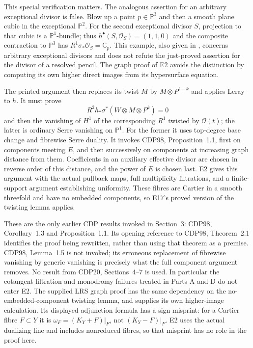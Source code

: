 This special verification matters. The analogous assertion for
an arbitrary exceptional divisor is false. Blow up a point
$p\in\mathbb P^3$ and then a smooth plane cubic in the exceptional
$\mathbb P^2$. For the second exceptional divisor $S$, projection
to that cubic is a $\mathbb P^1$-bundle; thus
$h^\bullet(S,\mathcal O_S)=(1,1,0)$ and the composite contraction
to $\mathbb P^3$ has
$R^1\sigma_*\mathcal O_S=\mathbb C_p$.
This example, also given in \cite{LRS2019}, concerns arbitrary
exceptional divisors and does not refute the just-proved assertion
for the divisor of a resolved pencil. The graph proof of E2
avoids the distinction by computing its own higher direct images
from its hypersurface equation.

The printed argument then replaces its twist $M$ by
$M\otimes P^{t+k}$ and applies Leray to $h$. It must prove
\[
 R^2h_*\sigma^*(W\otimes M\otimes P^k)=0
\]
and then the vanishing of $H^1$ of the corresponding $R^1$
twisted by $\mathcal O(t)$; the latter is ordinary Serre
vanishing on $\mathbb P^1$. For the former it uses top-degree
base change and fibrewise Serre duality. It invokes CDP98,
Proposition~1.1, first on components meeting $E$, and then
successively on components at increasing graph distance from
them. Coefficients in an auxiliary effective divisor are chosen
in reverse order of this distance, and the power of $E$ is
chosen last. E2 gives this argument with the actual pullback
maps, full multiplicity filtrations, and a finite-support
argument establishing uniformity. These fibres are Cartier in
a smooth threefold and have no embedded components, so E17's
proved version of the twisting lemma applies.

These are the only earlier CDP results invoked in Section~3:
CDP98, Corollary~1.3 and Proposition~1.1. Its opening reference
to CDP98, Theorem~2.1 identifies the proof being rewritten,
rather than using that theorem as a premise. CDP98, Lemma~1.5
is not invoked; its erroneous replacement of fibrewise vanishing
by generic vanishing is precisely what the full component
argument removes. No result from CDP20, Sections~4--7 is used.
In particular the cotangent-filtration and monodromy failures
treated in Parts A and D do not enter E2. The supplied LRS
graph proof has the same dependency on the no-embedded-component
twisting lemma, and supplies its own higher-image calculation.
Its displayed adjunction formula has a sign misprint:
for a Cartier fibre $F\subset Y$ it is
$\omega_F=(K_Y+F)|_F$, not $(K_Y-F)|_F$.
E2 uses the actual dualizing line and includes nonreduced fibres,
so that misprint has no role in the proof here.
